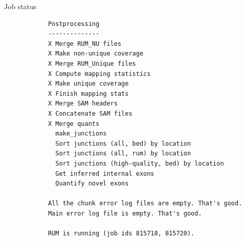 \documentclass{beamer}
\begin{document}
\begin{frame}[fragile]{Job status}
\tiny
\begin{verbatim}
            Postprocessing
            --------------
            X Merge RUM_NU files
            X Make non-unique coverage
            X Merge RUM_Unique files
            X Compute mapping statistics
            X Make unique coverage
            X Finish mapping stats
            X Merge SAM headers
            X Concatenate SAM files
            X Merge quants
              make_junctions
              Sort junctions (all, bed) by location
              Sort junctions (all, rum) by location
              Sort junctions (high-quality, bed) by location
              Get inferred internal exons
              Quantify novel exons
            
            All the chunk error log files are empty. That's good.
            Main error log file is empty. That's good.
            
            RUM is running (job ids 815718, 815720).
\end{verbatim}
\end{frame}
\end{document}

